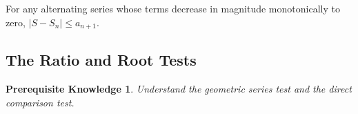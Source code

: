 \documentclass{myarticle}
\theoremstyle{nospace}
\newtheorem*{oldprereq}{Prerequisite Knowledge}
\newenvironment{prereq}
{\begin{mdframed}\begin{oldprereq}}
    {\end{oldprereq}\end{mdframed}}
\newtheorem{old series theorem}{Theorem}
\newenvironment{series theorem}
{\begin{mdframed}\begin{old series theorem}}
    {\end{old series theorem}\end{mdframed}}
\begin{document}
\begin{series theorem}
  For any alternating series whose terms decrease in magnitude
  monotonically to zero, $|S - S_n| \leq a_{n+1}$.
\end{series theorem}

\subsection{The Ratio and Root Tests}
\label{sec:ratio and root tests}

\begin{prereq}
  Understand the geometric series test and the direct comparison test.
\end{prereq}

\begin{figure}[htbp] \centering
  \begin{tikzpicture}


\end{tikzpicture}
\end{figure}
\end{document}
